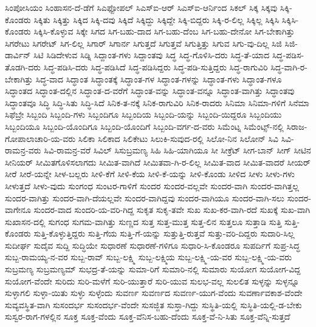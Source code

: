 {ಸಿಂಪೋಸಿಯಂ
ಸಿಂಹಾಸನ-ದೆ-ಡೆಗೆ
ಸಿಎಫ್ಪೋಪಲ್
ಸಿಎಸ್ಐ-ಆರ್
ಸಿಎಸ್ಐ-ಆರ್ನಿಂದ
ಸಿಕಲ್
ಸಿಕ್ಕ
ಸಿಕ್ಕವು
ಸಿಕ್ಕಿ-ಕೊಂಡರು
ಸಿಕ್ಕಿತು
ಸಿಕ್ಕಿತ್ತು
ಸಿಕ್ಕಿದ
ಸಿಕ್ಕಿ-ದವು
ಸಿಕ್ಕಿದೆ
ಸಿಕ್ಕಿದ್ದು
ಸಿಕ್ಕಿದ್ದೇ
ಸಿಕ್ಕಿ-ಬಿದ್ದರು
ಸಿಕ್ಕಿ-ರ-ಲಿಲ್ಲ
ಸಿಕ್ಕಿಲ್ಲ
ಸಿಕ್ಕಿಸಿ
ಸಿಕ್ಕಿಸಿ-ಕೊಂಡರು
ಸಿಕ್ಕಿಸಿ-ಕೊಳ್ಳುವ
ಸಿಕ್ಕೇ
ಸಿಗದ
ಸಿಗ-ಬಹು-ದಾದ
ಸಿಗ-ಬಹು-ದೆಂಬ
ಸಿಗ-ಬಹು-ದೇನೋ
ಸಿಗ-ಬೇಕಾಗಿತ್ತು
ಸಿಗರೇಟು
ಸಿಗರೇಟ್
ಸಿಗ-ಲಿಲ್ಲ
ಸಿಗಾರ್
ಸಿಗಾರ್ನ
ಸಿಗುತ್ತದೆ
ಸಿಗುತ್ತವೆ
ಸಿಗುತ್ತಿತ್ತು
ಸಿಗುವ
ಸಿಗು-ವು-ದಿಲ್ಲ
ಸಿಜಿ
ಸಿಜಿ-ಡಾರ್ವಿನ್
ಸಿಟಿ
ಸಿಡಿದೇಳುವ
ಸಿಡ್ನಿ
ಸಿದ್ದಾಂತ-ಗಳು
ಸಿದ್ದಾಂತವು
ಸಿದ್ಧ
ಸಿದ್ಧ-ಗೊಳಿಸಿ-ದರು
ಸಿದ್ಧ-ತೆ-ಯಾದ
ಸಿದ್ಧ-ಪಡಿಸ-ತೊಡಗಿ-ದರು
ಸಿದ್ಧ-ಪಡಿಸಿ-ದರು
ಸಿದ್ಧ-ಪಡಿಸಿದೆ
ಸಿದ್ಧ-ಪಡಿಸಿದ್ದರು
ಸಿದ್ಧ-ಪಡಿ-ಸುತ್ತಿದ್ದರು
ಸಿದ್ಧ-ರಾಗುವಿರಿ
ಸಿದ್ಧ-ವಾಗಿ-ರ-ಬೇಕಾಗಿತ್ತು
ಸಿದ್ಧ-ವಾದ
ಸಿದ್ಧಾಂತ
ಸಿದ್ಧಾಂತಕ್ಕೆ
ಸಿದ್ಧಾಂತ-ಗಳ
ಸಿದ್ಧಾಂತ-ಗಳನ್ನು
ಸಿದ್ಧಾಂತ-ಗಳು
ಸಿದ್ಧಾಂತ-ಗಳೂ
ಸಿದ್ಧಾಂತದ
ಸಿದ್ಧಾಂತ-ದಲ್ಲಿನ
ಸಿದ್ಧಾಂತ-ದ-ವರೆಗೆ
ಸಿದ್ಧಾಂತ-ವನ್ನು
ಸಿದ್ಧಾಂತ-ವನ್ನೂ
ಸಿದ್ಧಾಂತ-ವಾಗಿತ್ತು
ಸಿದ್ಧಾಂತವು
ಸಿದ್ಧಾಂತವೂ
ಸಿದ್ಧಿ
ಸಿದ್ಧಿ-ಸಿತು
ಸಿದ್ಧಿ-ಸಿದೆ
ಸಿನಿಕ-ತ-ನಕ್ಕೆ
ಸಿನಿಕ-ರಾಗುವಿರಿ
ಸಿನಿಕ-ರಾದರು
ಸಿನಿಮಾ
ಸಿನಿಮಾ-ಗಳಿಗೆ
ಸಿನೆಮಾ
ಸಿಫೆಬ್ರೇ
ಸಿಬ್ಬಂದಿ
ಸಿಬ್ಬಂದಿ-ಗಳು
ಸಿಬ್ಬಂದಿಗೂ
ಸಿಬ್ಬಂದಿಯ
ಸಿಬ್ಬಂದಿ-ಯನ್ನು
ಸಿಬ್ಬಂದಿ-ಯಿದ್ದರೂ
ಸಿಬ್ಬಂದಿಯು
ಸಿಬ್ಬಂದಿಯೂ
ಸಿಬ್ಬಂದಿ-ಯೊಂದಿಗೂ
ಸಿಬ್ಬಂದಿ-ಯೊಂದಿಗೆ
ಸಿಬ್ಬಂದಿ-ವರ್ಗ-ದ-ವರು
ಸಿಮೆಂಟ್ನ
ಸಿಮೆಂಟ್ಸ್-ನಲ್ಲಿ
ಸಿರಾಜ-ಗೋಪಾಲಾಚಾರಿ-ಯ-ವರು
ಸಿಲಿಕಾ
ಸಿಲಿಕಾದ
ಸಿಲಿಕೇಟು
ಸಿಲುಕಿ-ಸುವುದ-ರಲ್ಲಿ
ಸಿಲೋ-ನಿನ
ಸಿಲೋನ್
ಸಿವಿ
ಸಿವಿ-ರಾಮನ್ರ-ವರು
ಸಿವಿ-ರಾಮನ್ರ-ವರೆ
ಸಿವಿಲ್
ಸಿಸುಬ್ರಮಣ್ಯ
ಸಿಹಿ
ಸಿಹಿ-ಯಾಗಿಯೂ
ಸೀ
ಸೀಕ್ರೆಟ್
ಸೀಗ-ಬಾನ್
ಸೀಗ್
ಸೀಟಿನ
ಸೀನಿಯರ್
ಸೀಮಿತಗೊಳಿಸಲಾಗದು
ಸೀಮಿತ-ವಾಗಿದೆ
ಸೀಮಿತವಾ-ಗಿ-ರ-ಲಿಲ್ಲ
ಸೀಮಿತ-ವಾದ
ಸೀಮಿತ-ವಾದರೆ
ಸೀಯರ್
ಸೀರೆ
ಸೀರೆ-ಯನ್ನೇ
ಸೀಳ-ಬಲ್ಲರು
ಸೀಳಿ-ಕೆಗೆ
ಸೀಳಿ-ಕೆಯ
ಸೀಳಿ-ಕೆ-ಯನ್ನು
ಸೀಳಿ-ಕೊಂಡು
ಸೀಳಿದ
ಸೀಳು
ಸೀಳು-ಗಳು
ಸೀಳುತ್ತದೆ
ಸೀಳು-ವುದು
ಸುಂಗಂಧ
ಸುಂಟರ-ಗಾಳಿಗೆ
ಸುಂದರ
ಸುಂದರ-ವಲ್ಲವೇ
ಸುಂದರ-ವಾಗಿ
ಸುಂದರ-ವಾಗಿತ್ತಲ್ಲ
ಸುಂದರ-ವಾಗಿತ್ತು
ಸುಂದರ-ವಾಗಿ-ದೆಯಲ್ಲವೇ
ಸುಂದರ-ವಾಗಿದ್ದವು
ಸುಂದರ-ವಾಗಿಯೂ
ಸುಂದರ-ವಾಗಿ-ಸಲು
ಸುಂದರ-ವಾಗೇನೂ
ಸುಂದರ-ವಾದ
ಸುಂದರಿ-ಯ-ವರಿ-ಗಿದ್ದ
ಸುಕೃತ
ಸುಕೃ-ತವೇ
ಸುಖ
ಸುಖ-ಕರ-ವಾಗಿ-ರದೆ
ಸುಖಕ್ಕೆ
ಸುಖ-ವಾಗಿ
ಸುಖಾಸನ-ದಲ್ಲಿ
ಸುಗಂಧ
ಸುಗಮ-ವಾಗಿತ್ತು
ಸುಣ್ಣದ
ಸುತ್ತ
ಸುತ್ತ-ಮುತ್ತ
ಸುತ್ತ-ಲಿನ
ಸುತ್ತಲೂ
ಸುತ್ತಾಡಿ
ಸುತ್ತಿ
ಸುತ್ತಿ-ಕೊಂಡರು
ಸುತ್ತಿ-ಕೊಳ್ಳುತ್ತಿದ್ದರು
ಸುತ್ತಿ-ಗೆಯ
ಸುತ್ತಿ-ಗೆ-ಯನ್ನು
ಸುತ್ತುತ್ತಿ-ರುತ್ತವೆ
ಸುತ್ತು-ವರಿ-ದಿದ್ದರು
ಸುದಾರಿ-ಸಿಲ್ಲ
ಸುದೀರ್ಘ
ಸುದೈವ
ಸುದ್ದಿ
ಸುದ್ಧಿಯೇ
ಸುಧಾರಣೆ
ಸುಧಾರಣೆ-ಗಳಿಗೂ
ಸುಧಾರಿ-ಸಿ-ಕೊಂಡರೂ
ಸುಪರ್ದಿಗೆ
ಸುಪ್ರ-ಸಿದ್ಧ
ಸುಬ್ಬ-ರಾಮಯ್ಯ-ನ-ವರ
ಸುಬ್ಬ-ರಾವ್
ಸುಬ್ಬ-ಲಕ್ಷ್ಮಿ
ಸುಬ್ಬ-ಲಕ್ಷ್ಮಿಯ
ಸುಬ್ಬ-ಲಕ್ಷ್ಮಿ-ಯ-ವರ
ಸುಬ್ಬ-ಲಕ್ಷ್ಮಿ-ಯ-ವರು
ಸುಬ್ರಮಣ್ಯ
ಸುಬ್ರಮಣ್ಯಮ್
ಸುಭದ್ರ-ತೆ-ಯನ್ನು
ಸುಮಾ-ರಿಗೆ
ಸುಮಾರಿ-ನಲ್ಲಿ
ಸುಮಾರು
ಸುಯೋಗ
ಸುಯೋಗ-ವಿದ್ದ
ಸುಯೋಗ-ವೆಂದೇ
ಸುರಿದು
ಸುರಿ-ಮಳೆಗೆ
ಸುರಿ-ಯುತ್ತಾರೆ
ಸುರಿ-ಯುವ
ಸುಲಭ-ವಲ್ಲ
ಸುಲಲಿತ
ಸುಳ್ಳನ್ನು
ಸುಳ್ಳನ್ನೂ
ಸುಳ್ಳಾಗಲಿ
ಸುಳ್ಳಾ-ಯಿತು
ಸುಳ್ಳು
ಸುಳ್ಳೆಂದು
ಸುವರ್ಣ
ಸುವರ್ಣದ
ಸುವರ್ಣ-ಯುಗ-ವೆಂದು
ಸುವರ್ಣಾವಕಾಶ-ವೆಂದೇ
ಸುವ್ಯವಸ್ಥಿತ-ವಾಗಿ
ಸುಸಂದರ್ಭ
ಸುಸಂದರ್ಭ-ವೆಂದೇ
ಸುಸಜ್ಜಿತ
ಸುಸ್ತಾ-ಗಿದ್ದು
ಸುಸ್ಥಿತಿ-ಯಲ್ಲಿ
ಸುಸ್ಥಿತಿ-ಯಲ್ಲಿ-ಡ-ಬೇಕು
ಸುಸ್ವರ-ರಾಗ-ಗಳಲ್ಲಿನ
ಸೂಕ್ತ
ಸೂಕ್ತ-ವೆಂದು
ಸೂಕ್ತ-ವೆನಿಸ-ಬಹು-ದೆಂದು
ಸೂಕ್ತ-ವೆ-ನಿ-ಸಿತು
ಸೂಕ್ತ-ವೆನ್ನಿ-ಸುತ್ತದೆ
}
